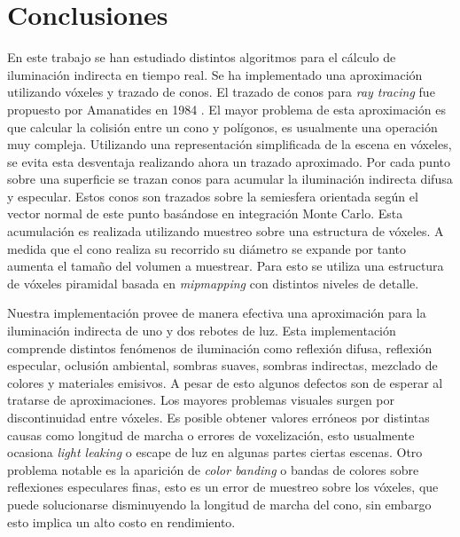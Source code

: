 \chapter{Conclusiones}
\label{chap:conclusion}
En este trabajo se han estudiado distintos algoritmos para el cálculo de iluminación indirecta en tiempo real. Se ha implementado una aproximación utilizando vóxeles y trazado de conos. El trazado de conos para \emph{ray tracing} fue propuesto por Amanatides en 1984 \cite{Amanatides:1984:RTC:800031.808589}. El mayor problema de esta aproximación es que calcular la colisión entre un cono y polígonos, es usualmente una operación muy compleja. Utilizando una representación simplificada de la escena en vóxeles, se evita esta desventaja realizando ahora un trazado aproximado. Por cada punto sobre una superficie se trazan conos para acumular la iluminación indirecta difusa y especular. Estos conos son trazados sobre la semiesfera orientada según el vector normal de este punto basándose en integración Monte Carlo. Esta acumulación es realizada utilizando muestreo sobre una estructura de vóxeles. A medida que el cono realiza su recorrido su diámetro se expande por tanto aumenta el tamaño del volumen a muestrear. Para esto se utiliza una estructura de vóxeles piramidal basada en \emph{mipmapping} con distintos niveles de detalle.

Nuestra implementación provee de manera efectiva una aproximación para la iluminación indirecta de uno y dos rebotes de luz. Esta implementación comprende distintos fenómenos de iluminación como reflexión difusa, reflexión especular, oclusión ambiental, sombras suaves, sombras indirectas, mezclado de colores y materiales emisivos. A pesar de esto algunos defectos son de esperar al tratarse de aproximaciones. Los mayores problemas visuales surgen por discontinuidad entre vóxeles. Es posible obtener valores erróneos por distintas causas como longitud de marcha o errores de voxelización, esto usualmente ocasiona \emph{light leaking} o escape de luz en algunas partes ciertas escenas. Otro problema notable es la aparición de \emph{color banding} o bandas de colores sobre reflexiones especulares finas, esto es un error de muestreo sobre los vóxeles, que puede solucionarse disminuyendo la longitud de marcha del cono, sin embargo esto implica un alto costo en rendimiento.

